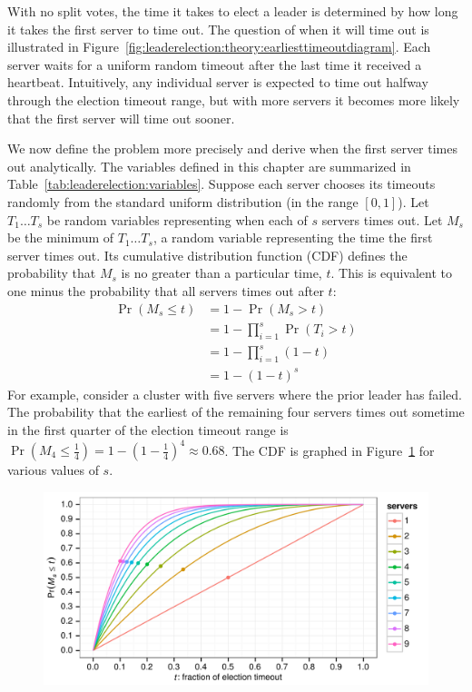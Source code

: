 With no split votes, the time it takes to elect a leader is determined
by how long it takes the first server to time out. The question of when
it will time out is illustrated in
Figure~\ref{fig:leaderelection:theory:earliesttimeoutdiagram}. Each server
waits for a uniform random timeout after the last time it received a
heartbeat. Intuitively, any individual server is expected to time out
halfway through the election timeout range, but with more servers it
becomes more likely that the first server will time out sooner.

We now define the problem more precisely and derive when the first
server times out analytically. The variables defined in this chapter are
summarized in Table~\ref{tab:leaderelection:variables}. Suppose each
server chooses its timeouts randomly from the standard
uniform distribution (in the range $[0,1]$). Let $T_1 \ldots T_s$ be
random variables representing when each of $s$ servers times out. Let $M_s$ be the minimum of
$T_1 \ldots T_s$, a random variable representing the time the first
server times out. Its cumulative distribution function (CDF) defines the
probability that $M_s$ is no greater than a particular time, $t$. This
is equivalent to one minus the probability that all servers times out
after $t$:
\begin{align*}
\Pr(M_s \leq t)
        &= 1 - \Pr(M_s > t) \\
        &= 1 - \prod_{i=1}^s \Pr(T_i > t) \\
        &= 1 - \prod_{i=1}^s (1 - t) \\
        &= 1 - (1-t)^s
\end{align*}
%
For example, consider a cluster with five servers where the prior
leader has failed.
The probability that the earliest of the remaining four servers times out
sometime in the first quarter of the election timeout range is
$\Pr(M_4 \leq \frac{1}{4}) = 1 - (1 - \frac{1}{4})^4 \approx 0.68$.
The CDF is graphed in
Figure~\ref{fig:leaderelection:theory:model:earliesttimeout}
for various values of $s$.

\begin{figure}
\centering
\includegraphics{leaderelection/earliesttimeout}
\vspace{-2ex}
\label{fig:leaderelection:theory:model:earliesttimeout}
\end{figure}

